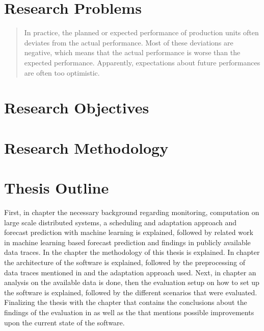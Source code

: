         \section{Research Problems}
        \label{sec:research-problems-introduction}

            \begin{quote}
                In practice, the planned or expected performance of production units often deviates from the actual performance. Most of these deviations are negative, which means that the actual performance is worse than the expected performance. Apparently, expectations about future performances are often too optimistic. \cite{stoopComplexitySchedulingPractice1996}
            \end{quote}

        \section{Research Objectives}
        \label{sec:research-objectives-introduction}

        \section{Research Methodology}
        \label{sec:research-methodology-introduction}
        
        \section{Thesis Outline}
        \label{sec:thesis-outline-introduction}

            First, in chapter  the necessary background regarding monitoring, computation on large scale distributed systems, a scheduling and adaptation approach and forecast prediction with machine learning is explained, followed by related work in machine learning based forecast prediction and findings in publicly available data traces.
            In the chapter  the methodology of this thesis is explained. 
            In chapter  the architecture of the software is explained, followed by the preprocessing of data traces mentioned in  and the adaptation approach used.
            Next, in chapter  an analysis on the available data is done, then the evaluation setup on how to set up the software is explained, followed by the different scenarios that were evaluated. 
            Finalizing the thesis with the chapter  that contains the conclusions about the findings of the evaluation in  as well as the  that mentions possible improvements upon the current state of the software.


